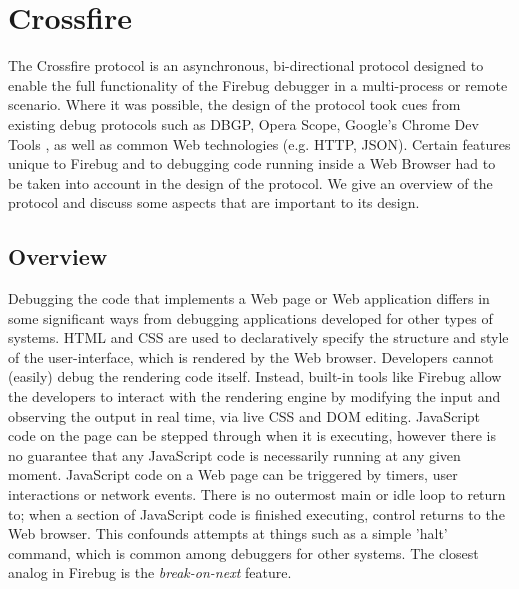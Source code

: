 \section {Crossfire}

The Crossfire protocol is an asynchronous, bi-directional protocol designed to
enable the full functionality of the Firebug debugger in a multi-process or
remote scenario. Where it was possible, the design of the protocol took cues
from existing debug protocols such as DBGP\cite{dbgp}, Opera
Scope\cite{opera-scope}, Google's Chrome Dev Tools\cite{chrome-dev-tools} , as
well as common Web technologies (e.g. HTTP, JSON\cite{json}). Certain
features unique to Firebug and to debugging code running inside a Web Browser
had to be taken into account in the design of the protocol.
We give an overview of the protocol and discuss some aspects that are important to its design.

\subsection {Overview}
Debugging the code that implements a Web page or Web application differs in some
significant ways from debugging applications developed for other types of
systems. HTML and CSS are used to declaratively specify the structure and style of the
user-interface, which is rendered by the Web browser. Developers cannot (easily)
debug the rendering code itself. Instead, built-in tools like Firebug allow the
developers to interact with the rendering engine by modifying the input and
observing the output in real time, via live CSS and DOM editing. JavaScript code
on the page can be stepped through when it is executing, however there is no
guarantee that any JavaScript code is necessarily running at any given moment.
JavaScript code on a Web page can be triggered by timers, user interactions or
network events. There is no outermost main or idle loop to return to; when a
section of JavaScript code is finished executing, control returns to the Web
browser. This confounds attempts at things such as a simple 'halt' command,
which is common among debuggers for other systems. The closest analog in Firebug
is the \textit{break-on-next} feature.


